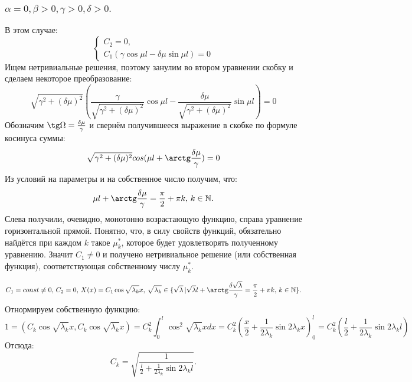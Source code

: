 \documentclass[12pt, a4paper]{report}
\begin{document}
\subsubsection{ $ \alpha = 0, \beta > 0, \gamma > 0, \delta > 0. $}
В этом случае:
\begin{displaymath}
	\begin{cases}
		C_{2} = 0, \\
		C_{1} (\gamma \cos \mu l - \delta \mu \sin \mu l) = 0
	\end{cases}
\end{displaymath}
Ищем нетривиальные решения, поэтому занулим во втором уравнении скобку и сделаем некоторое преобразование:
\[ \sqrt{\gamma ^2 + (\delta \mu)^2 }(\frac{\gamma}{\sqrt{\gamma ^2 + (\delta \mu)^2 }} \cos \mu l - \frac{\delta \mu}{\sqrt{\gamma ^2 + (\delta \mu)^2 }}\sin \mu l) = 0 \]
Обозначим $\tg \Omega = \frac{\delta \mu}{\gamma}$ и свернём получившееся выражение в скобке по формуле косинуса суммы:
\[ \sqrt{\gamma ^2 + (\delta \mu)^2 } cos(\mu l + \arctg  \frac{\delta \mu}{\gamma}) = 0 \]
Из условий на параметры и на собственное число получим, что:
\[ \mu l + \arctg  \frac{\delta \mu}{\gamma} = \frac{\pi}{2} + \pi k, \, k \in \mathbb{N}. \]
Слева получили, очевидно, монотонно возрастающую функцию, справа уравнение горизонтальной прямой. Понятно, что, в силу свойств функций, обязательно найдётся при каждом $k$ такое $\mu ^{*}_{k}$, которое будет удовлетворять полученному уравнению. Значит $C_{1} \ne 0$ и получено нетривиальное решение (или собственная функция), соответствующая собственному числу $\mu ^{*}_{k}$.

\[ C_{1} = const \ne 0, \, C_{2} = 0, \, X(x) = C_{1} \cos \sqrt{\lambda_{k}} x, \, \sqrt{\lambda_{k}} \in \{\sqrt{\lambda} \, | \sqrt{\lambda} l + \arctg  \frac{\delta \sqrt{\lambda}}{\gamma} = \frac{\pi}{2} + \pi k, \, k \in \mathbb{N}\}. \]
Отнормируем собственную функцию:
\[ 1 = (C_{k} \cos \sqrt{\lambda_{k}} x, C_{k} \cos \sqrt{\lambda_{k}} x) = C_{k}^2 \int_{0}^{l}  \cos^2 \sqrt{\lambda_{k}} xdx = C_{k}^2 (\frac{x}{2} + \frac{1}{2\lambda_{k}} \sin 2\lambda_{k} x)_0^l =   C_{k}^2 (\frac{l}{2} + \frac{1}{2\lambda_{k}} \sin 2\lambda_{k} l) \]
Отсюда:
\[ C_{k} = \sqrt{\frac{1}{\frac{l}{2} + \frac{1}{2\lambda_{k}} \sin 2\lambda_{k} l}}. \]
\end{document}
